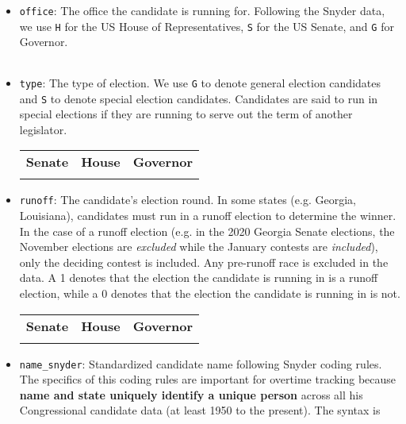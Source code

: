 \documentclass[12pt]{article}
\begin{document}
\begin{itemize}[leftmargin=*]

\item \texttt{office}: The office the candidate is running for. Following the Snyder data, we use \texttt{H} for the US House of Representatives, \texttt{S} for the US Senate, and \texttt{G} for Governor. 

    \begin{tabularx}{\linewidth}{C}
    
    \end{tabularx}
			

\item \texttt{type}: The type of election. We use \texttt{G} to denote general election candidates and \texttt{S} to denote special election candidates. Candidates are said to run in special elections if they are running to serve out the term of another legislator. 

\begin{tabularx}{\linewidth}{CCC}
    \textbf{Senate} & \textbf{House} & \textbf{Governor}\\
     &  & 
\end{tabularx}

\item \texttt{runoff}: The candidate's election round. In some states (e.g. Georgia, Louisiana), candidates must run in a runoff election to determine the winner. In the case of a runoff election (e.g. in the 2020 Georgia Senate elections, the November elections are \textit{excluded} while the January contests are \textit{included}), only the deciding contest is included. Any pre-runoff race is excluded in the data. A 1 denotes that the election the candidate is running in is a runoff election, while a 0 denotes that the election the candidate is running in is not. 

\begin{tabularx}{\linewidth}{CCC}
    \textbf{Senate} & \textbf{House} & \textbf{Governor}\\
     &  & 
\end{tabularx}

\item \texttt{name\_snyder}: Standardized candidate name following Snyder coding rules. The
specifics of this coding rules are important for overtime tracking because
\textbf{name and state uniquely identify a unique person} across all his
Congressional candidate data (at least 1950 to the present). The syntax
is


\end{itemize}
\end{document}
